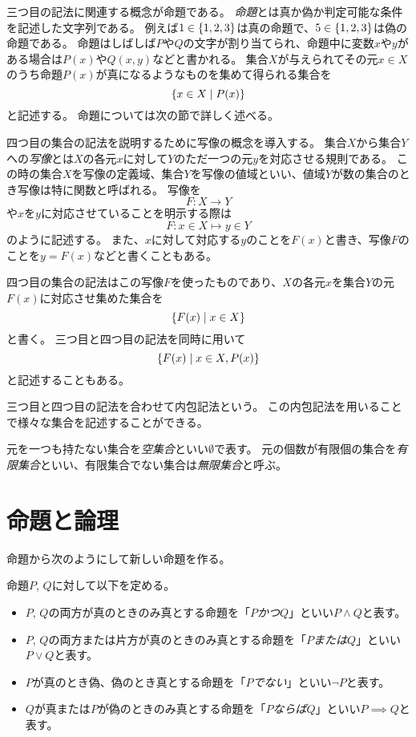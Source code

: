 三つ目の記法に関連する概念が命題である。
\emph{命題}とは真か偽か判定可能な条件を記述した文字列である。
例えば$1 \in \{ 1, 2, 3 \}$は真の命題で、$5 \in \{ 1, 2, 3 \}$は偽の命題である。
命題はしばしば$P$や$Q$の文字が割り当てられ、命題中に変数$x$や$y$がある場合は$P(x)$や$Q(x, y)$などと書かれる。
集合$X$が与えられてその元$x \in X$のうち命題$P(x)$が真になるようなものを集めて得られる集合を
$$
\{ x \in X \mid P(x) \}
$$
と記述する。
命題については次の節で詳しく述べる。

四つ目の集合の記法を説明するために写像の概念を導入する。
集合$X$から集合$Y$への\emph{写像}とは$X$の各元$x$に対して$Y$のただ一つの元$y$を対応させる規則である。
この時の集合$X$を写像の定義域、集合$Y$を写像の値域といい、値域$Y$が数の集合のとき写像は特に関数と呼ばれる。
写像を
$$
F: X \to Y
$$
や$x$を$y$に対応させていることを明示する際は
$$
F: x \in X \mapsto y \in Y
$$
のように記述する。
また、$x$に対して対応する$y$のことを$F(x)$と書き、写像$F$のことを$y = F(x)$などと書くこともある。

四つ目の集合の記法はこの写像$F$を使ったものであり、$X$の各元$x$を集合$Y$の元$F(x)$に対応させ集めた集合を
$$
\{ F(x) \mid x \in X\}
$$
と書く。
三つ目と四つ目の記法を同時に用いて
$$
\{ F(x) \mid x \in X, P(x) \}
$$
と記述することもある。

三つ目と四つ目の記法を合わせて内包記法という。
この内包記法を用いることで様々な集合を記述することができる。

元を一つも持たない集合を\emph{空集合}といい$\emptyset$で表す。
元の個数が有限個の集合を\emph{有限集合}といい、有限集合でない集合は\emph{無限集合}と呼ぶ。

\section{命題と論理}

命題から次のようにして新しい命題を作る。

\begin{definition}[命題の演算]
命題$P$, $Q$に対して以下を定める。
\begin{itemize}
\item
$P$, $Q$の両方が真のときのみ真とする命題を「$P$\emph{かつ}$Q$」といい$P \land Q$と表す。
\item
$P$, $Q$の両方または片方が真のときのみ真とする命題を「$P$\emph{または}$Q$」といい$P \lor Q$と表す。
\item
$P$が真のとき偽、偽のとき真とする命題を「$P$\emph{でない}」といい$\lnot P$と表す。
\item
$Q$が真または$P$が偽のときのみ真とする命題を「$P$\emph{ならば}$Q$」といい$P \implies Q$と表す。
\end{itemize}
\end{definition}

